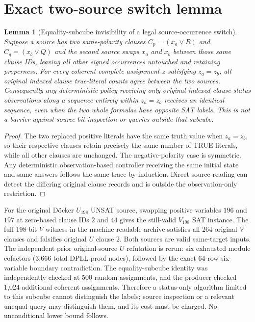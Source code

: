 \documentclass[11pt]{article}
\newtheorem{lemma}[theorem]{Lemma}
\begin{document}
\section{Exact two-source switch lemma}
\begin{lemma}[Equality-subcube invisibility of a legal source-occurrence switch]
Suppose a source has two same-polarity clauses $C_p=(x_a\lor R)$ and $C_q=(x_b\lor Q)$ and the second source swaps $x_a$ and $x_b$ between those same clause IDs, leaving all other signed occurrences untouched and retaining properness. For every coherent complete assignment $z$ satisfying $z_a=z_b$, all \emph{original indexed clause true-literal counts} agree between the two sources. Consequently any deterministic policy receiving only original-indexed clause-status observations along a sequence entirely within $z_a=z_b$ receives an identical sequence, even when the two whole formulas have opposite SAT labels. This is not a barrier against source-bit inspection or queries outside that subcube.
\end{lemma}
\begin{proof}
The two replaced positive literals have the same truth value when $z_a=z_b$, so their respective clauses retain precisely the same number of TRUE literals, while all other clauses are unchanged. The negative-polarity case is symmetric. Any deterministic observation-based controller receiving the same initial state and same answers follows the same trace by induction. Direct source reading can detect the differing original clause records and is outside the observation-only restriction.
\end{proof}

For the original Döcker $U_{198}$ UNSAT source, swapping positive variables $196$ and $197$ at zero-based clause IDs $2$ and $44$ gives the still-valid $V_{198}$ SAT instance. The full 198-bit $V$ witness in the machine-readable archive satisfies all 264 original $V$ clauses and falsifies original $U$ clause $2$. Both sources are valid same-target inputs. The independent prior original-source $U$ refutation is rerun: six exhausted module cofactors (3,666 total DPLL proof nodes), followed by the exact 64-row six-variable boundary contradiction. The equality-subcube identity was independently checked at 500 random assignments, and the producer checked 1,024 additional coherent assignments. Therefore a status-only algorithm limited to this subcube cannot distinguish the labels; source inspection or a relevant unequal query may distinguish them, and its cost must be charged. No unconditional lower bound follows.
\end{document}
